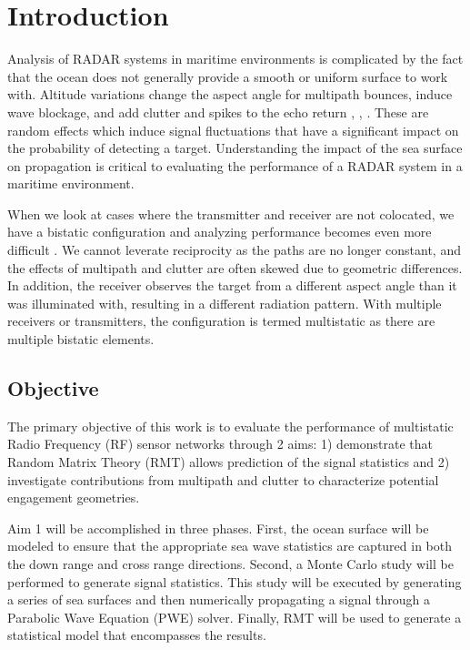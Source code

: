 \section{Introduction}
Analysis of RADAR systems in maritime environments is complicated by the fact that the ocean does not generally provide a smooth or uniform surface to work with. Altitude variations change the aspect angle for multipath bounces, induce wave blockage, and add clutter and spikes to the echo return \cite{skolnik_handbook}, \cite{blake_radar}, \cite{nathanson_radar}. These are random effects which induce signal fluctuations that have a significant impact on the probability of detecting a target. Understanding the impact of the sea surface on propagation is critical to evaluating the performance of a RADAR system in a maritime environment.

When we look at cases where the transmitter and receiver are not colocated, we have a bistatic configuration and analyzing performance becomes even more difficult \cite{willis_bistatic}. We cannot leverate reciprocity as the paths are no longer constant, and the effects of multipath and clutter are often skewed due to geometric differences.  In addition, the receiver observes the target from a different aspect angle than it was illuminated with, resulting in a different radiation pattern. With multiple receivers or transmitters, the configuration is termed multistatic as there are multiple bistatic elements.

\subsection{Objective}
The primary objective of this work is to evaluate the performance of multistatic Radio Frequency (RF) sensor networks through 2 aims: 1) demonstrate that Random Matrix Theory (RMT) allows prediction of the signal statistics and 2) investigate contributions from multipath and clutter to characterize potential engagement geometries. 

Aim 1 will be accomplished in three phases. First, the ocean surface will be modeled to ensure that the appropriate sea wave statistics are captured in both the down range and cross range directions. Second, a Monte Carlo study will be performed to generate signal statistics. This study will be executed by generating a series of sea surfaces and then numerically propagating a signal through a Parabolic Wave Equation (PWE) solver. Finally, RMT will be used to generate a statistical model that encompasses the results.

